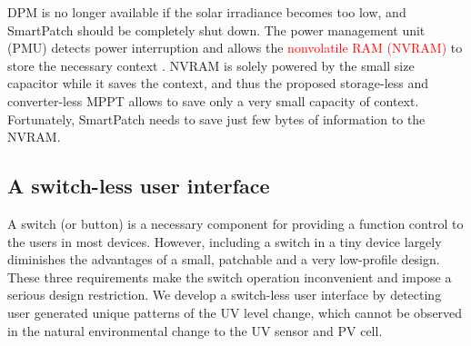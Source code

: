 \documentclass[journal]{IEEEtran}
\begin{document}
DPM is no longer available if the solar irradiance becomes too low, and SmartPatch should be completely shut down. The power management unit (PMU) detects power interruption and allows the \textcolor{red}{nonvolatile RAM (NVRAM)} to store the necessary context \cite{Balsamo:TCAD16}. NVRAM is solely powered by the small size capacitor while it saves the context, and thus the proposed storage-less and converter-less MPPT allows to save only a very small capacity of context. Fortunately, SmartPatch needs to save just few bytes of information to the NVRAM.

%

\subsection{A switch-less user interface}
A switch (or button) is a necessary component for providing a function control to the users in most devices. However, including a switch in a tiny device largely diminishes the advantages of a small, patchable and a very low-profile design. These three requirements make the switch operation inconvenient and impose a serious design restriction. We develop a switch-less user interface by detecting user generated unique patterns of the UV level change, which cannot be observed in the natural environmental change to the UV sensor and PV cell.
\end{document}
